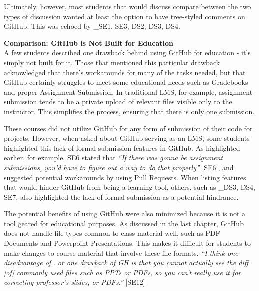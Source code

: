 
Ultimately, however, most students that would discuss compare between the two types of discussion wanted at least the option to have tree-styled comments on GitHub. This was echoed by _{SE1, SE3, DS2, DS3, DS4}.

\textbf{Comparison: GitHub is Not Built for Education} \\
A few students described one drawback behind using GitHub for education - it's simply not built for it. Those that mentioned this particular drawback acknowledged that there's workarounds for many of the tasks needed, but that GitHub certainly struggles to meet some educational needs such as Gradebooks and proper Assignment Submission. In traditional LMS, for example, assignment submission tends to be a private upload of relevant files visible only to the instructor. This simplifies the process, ensuring that there is only one submission.

These courses did not utilize GitHub for any form of submission of their code for projects. However, when asked about GitHub serving as an LMS, some students highlighted this lack of formal submission features in GitHub. As highlighted earlier, for example, SE6 stated that \textit{``If there was gonna be assignment submissions, you'd have to figure out a way to do that properly''} [SE6], and suggested potential workarounds by using Pull Requests. When listing features that would hinder GitHub from being a learning tool, others, such as _{DS3, DS4, SE7}, also highlighted the lack of formal submission as a potential hindrance.

The potential benefits of using GitHub were also minimized because it is not a tool geared for educational purposes. As discussed in the last chapter, GitHub does not handle file types common to class material well, such as PDF Documents and Powerpoint Presentations. This makes it difficult for students to make changes to course material that involve these file formats. \textit{``I think one disadvantage of.. or one drawback of GH is that you cannot actually see the diff [of] commonly used files such as PPTs or PDFs, so you can't really use it for correcting professor's slides, or PDFs.''} [SE12]

